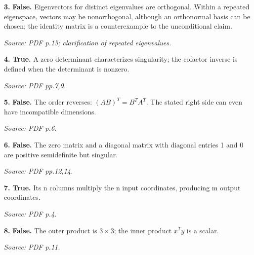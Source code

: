 \documentclass[11pt,a4paper]{article}
\begin{document}
\par\noindent\begin{minipage}{\linewidth}
\textbf{3.} \textbf{False.} Eigenvectors for distinct eigenvalues are orthogonal. Within a repeated eigenspace, vectors may be nonorthogonal, although an orthonormal basis can be chosen; the identity matrix is a counterexample to the unconditional claim.

{\footnotesize\textit{Source: PDF p.15; clarification of repeated eigenvalues.}}
\end{minipage}\par\vspace{3mm}
\par\noindent\begin{minipage}{\linewidth}
\textbf{4.} \textbf{True.} A zero determinant characterizes singularity; the cofactor inverse is defined when the determinant is nonzero.

{\footnotesize\textit{Source: PDF pp.7,9.}}
\end{minipage}\par\vspace{3mm}
\par\noindent\begin{minipage}{\linewidth}
\textbf{5.} \textbf{False.} The order reverses: \((AB)^T=B^TA^T\). The stated right side can even have incompatible dimensions.

{\footnotesize\textit{Source: PDF p.6.}}
\end{minipage}\par\vspace{3mm}
\par\noindent\begin{minipage}{\linewidth}
\textbf{6.} \textbf{False.} The zero matrix and a diagonal matrix with diagonal entries 1 and 0 are positive semidefinite but singular.

{\footnotesize\textit{Source: PDF pp.12,14.}}
\end{minipage}\par\vspace{3mm}
\par\noindent\begin{minipage}{\linewidth}
\textbf{7.} \textbf{True.} Its n columns multiply the n input coordinates, producing m output coordinates.

{\footnotesize\textit{Source: PDF p.4.}}
\end{minipage}\par\vspace{3mm}
\par\noindent\begin{minipage}{\linewidth}
\textbf{8.} \textbf{False.} The outer product is \(3\times3\); the inner product \(x^Ty\) is a scalar.

{\footnotesize\textit{Source: PDF p.11.}}
\end{minipage}\par\vspace{3mm}
\end{document}
